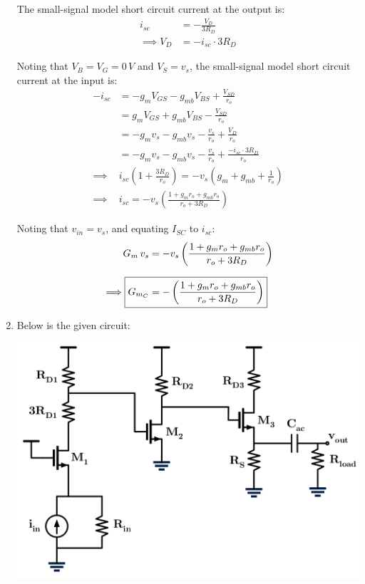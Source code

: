 \documentclass[12pt, fleqn]{article}
\begin{document}
\begin{enumerate}[label=(\alph*)]
{    The small-signal model short circuit current at the output is:
    \begin{align}
        i_{sc} &= -\frac{V_D}{3R_D}\\[0.25cm]
        \implies V_D &= -i_{sc} \cdot 3R_D
    \end{align}
    
    Noting that $V_B = V_G = 0\,V$ and $V_S = v_s$, the small-signal model short circuit current at the input is:
    \begin{align}
        -i_{sc} &= -g_m V_{GS} - g_{mb} V_{BS} + \frac{V_{SD}}{r_o}\\[0.25cm]
        &= g_m V_{GS} + g_{mb} V_{BS} - \frac{V_{SD}}{r_o}\\[0.25cm]
        &= -g_m v_s - g_{mb} v_s - \frac{v_s}{r_o} + \frac{V_D}{r_o}\\[0.25cm]
        &= -g_m v_s - g_{mb} v_s - \frac{v_s}{r_o} + \frac{-i_{sc} \cdot 3R_D}{r_o}\\[0.25cm]
        \implies & i_{sc} \left(1 + \frac{3R_D}{r_o}\right) = -v_s\left(g_m + g_{mb} + \frac{1}{r_o}\right)\\[0.25cm]
        \implies & i_{sc} = -v_s\left(\frac{1 + g_m r_o + g_{mb} r_o}{r_o + 3R_D}\right)
    \end{align}

    Noting that $v_{in} = v_s$, and equating $I_{SC}$ to $i_{sc}$:
    \begin{align}
        G_m\,v_s &= -v_s\left(\frac{1 + g_m r_o + g_{mb} r_o}{r_o + 3R_D}\right)\\[0.25cm]
        \implies\Aboxed{G_{m_C} &= -\left(\frac{1 + g_m r_o + g_{mb} r_o}{r_o + 3R_D}\right)}
    \end{align}
    }
    \newpage
    \item
    {
    Below is the given circuit:
    
    \includegraphics[scale=0.45, center]{p2d.png}\\

}
\end{enumerate}
\end{document}
